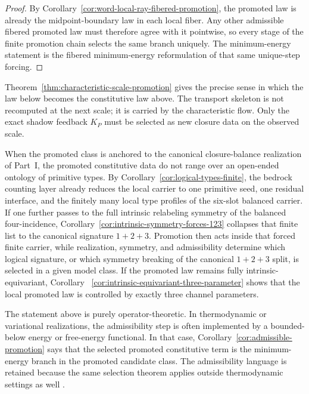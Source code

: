 \begin{proof}
By Corollary~\ref{cor:word-local-ray-fibered-promotion}, the promoted law is
already the midpoint-boundary law in each local fiber. Any other admissible
fibered promoted law must therefore agree with it pointwise, so every stage of
the finite promotion chain selects the same branch uniquely. The
minimum-energy statement is the fibered minimum-energy reformulation of that
same unique-step forcing.
\end{proof}

\begin{remark}
\label{rem:carried-vs-closure}
Theorem~\ref{thm:characteristic-scale-promotion} gives the precise sense in
which the law below becomes the constitutive law above. The transport skeleton
is not recomputed at the next scale; it is carried by the characteristic flow.
Only the exact shadow feedback $K_P$ must be selected as new closure data on
the observed scale.
\end{remark}

\begin{remark}
\label{rem:typed-promotion-finite-carrier}
When the promoted class is anchored to the canonical closure-balance
realization of Part~I, the promoted constitutive data do not range over an
open-ended ontology of primitive types. By
Corollary~\ref{cor:logical-types-finite}, the bedrock counting layer
already reduces the local carrier to one primitive seed, one residual
interface, and the finitely many local type profiles of the six-slot balanced
carrier. If one further passes to the full intrinsic relabeling symmetry of the
balanced four-incidence, Corollary~\ref{cor:intrinsic-symmetry-forces-123}
collapses that finite list to the canonical signature $1+2+3$. Promotion then
acts inside that forced finite carrier, while realization, symmetry, and
admissibility determine which logical signature, or which symmetry breaking of
the canonical $1+2+3$ split, is selected in a given model class. If the
promoted law remains fully intrinsic-equivariant, Corollary
~\ref{cor:intrinsic-equivariant-three-parameter} shows that the local promoted
law is controlled by exactly three channel parameters.
\end{remark}

\begin{remark}
\label{rem:minimum-energy-promotion}
The statement above is purely operator-theoretic. In thermodynamic or
variational realizations, the admissibility step is often implemented by a
bounded-below energy or free-energy functional. In that case,
Corollary~\ref{cor:admissible-promotion} says that the selected promoted
constitutive term is the minimum-energy branch in the promoted candidate class.
The admissibility language is retained because the same selection theorem
applies outside thermodynamic settings as well \cite{Arnold1989,Goldenfeld1992}.
\end{remark}

